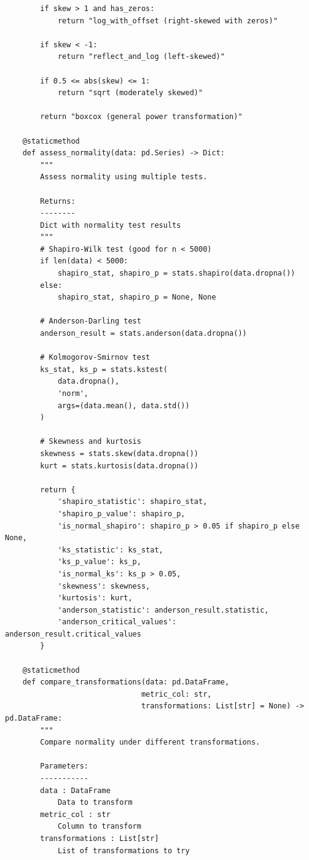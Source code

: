\begin{lstlisting}
        if skew > 1 and has_zeros:
            return "log_with_offset (right-skewed with zeros)"

        if skew < -1:
            return "reflect_and_log (left-skewed)"

        if 0.5 <= abs(skew) <= 1:
            return "sqrt (moderately skewed)"

        return "boxcox (general power transformation)"

    @staticmethod
    def assess_normality(data: pd.Series) -> Dict:
        """
        Assess normality using multiple tests.

        Returns:
        --------
        Dict with normality test results
        """
        # Shapiro-Wilk test (good for n < 5000)
        if len(data) < 5000:
            shapiro_stat, shapiro_p = stats.shapiro(data.dropna())
        else:
            shapiro_stat, shapiro_p = None, None

        # Anderson-Darling test
        anderson_result = stats.anderson(data.dropna())

        # Kolmogorov-Smirnov test
        ks_stat, ks_p = stats.kstest(
            data.dropna(),
            'norm',
            args=(data.mean(), data.std())
        )

        # Skewness and kurtosis
        skewness = stats.skew(data.dropna())
        kurt = stats.kurtosis(data.dropna())

        return {
            'shapiro_statistic': shapiro_stat,
            'shapiro_p_value': shapiro_p,
            'is_normal_shapiro': shapiro_p > 0.05 if shapiro_p else None,
            'ks_statistic': ks_stat,
            'ks_p_value': ks_p,
            'is_normal_ks': ks_p > 0.05,
            'skewness': skewness,
            'kurtosis': kurt,
            'anderson_statistic': anderson_result.statistic,
            'anderson_critical_values': anderson_result.critical_values
        }

    @staticmethod
    def compare_transformations(data: pd.DataFrame,
                               metric_col: str,
                               transformations: List[str] = None) -> pd.DataFrame:
        """
        Compare normality under different transformations.

        Parameters:
        -----------
        data : DataFrame
            Data to transform
        metric_col : str
            Column to transform
        transformations : List[str]
            List of transformations to try


\end{lstlisting}
